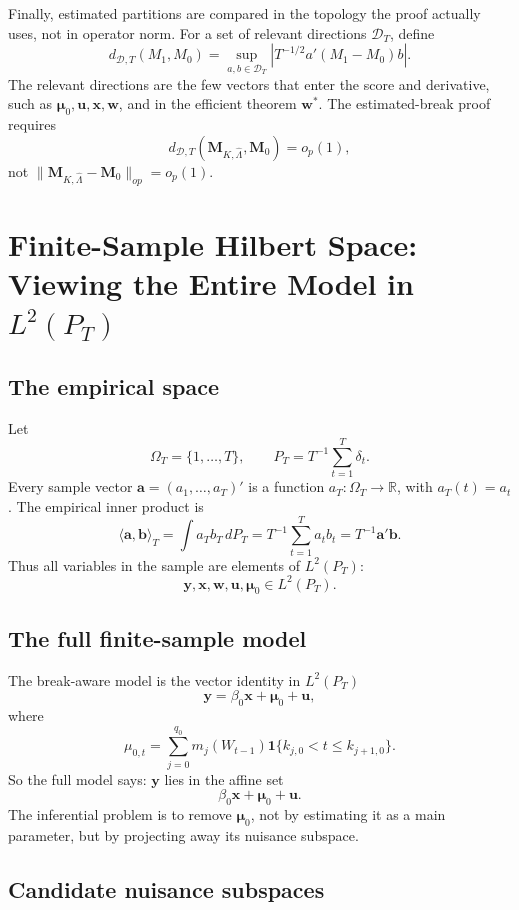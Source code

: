 \documentclass[12pt]{article}
\numberwithin{equation}{section}
\theoremstyle{definition}
\newcommand{\R}{\mathbb R}
\newcommand{\ind}{\mathbf 1}
\newcommand{\LtwoT}{L^2(P_T)}
\newcommand{\innerT}[2]{\langle #1,#2\rangle_T}
\begin{document}
Finally, estimated partitions are compared in the topology the proof actually
uses, not in operator norm. For a set of relevant directions \(\mathcal D_T\),
define
\[
    d_{\mathcal D,T}(M_1,M_0)
    =\sup_{a,b\in\mathcal D_T}
      \left|T^{-1/2}a'(M_1-M_0)b\right|.
\]
The relevant directions are the few vectors that enter the score and derivative,
such as \(\bm\mu_0,\bm u,\bm x,\bm w\), and in the efficient theorem
\(\bm w^*\). The estimated-break proof requires
\[
    d_{\mathcal D,T}(\bm M_{K,\widehat\Lambda},\bm M_0)=o_p(1),
\]
not \(\|\bm M_{K,\widehat\Lambda}-\bm M_0\|_{op}=o_p(1)\).
\section{Finite-Sample Hilbert Space: Viewing the Entire Model in \texorpdfstring{\(L^2(P_T)\)}{L2PT}}

\subsection{The empirical space}

Let
\[
    \Omega_T=\{1,\ldots,T\},
    \qquad
    P_T=T^{-1}\sum_{t=1}^T\delta_t.
\]
Every sample vector \(\bm a=(a_1,\ldots,a_T)'\) is a function
\(a_T:\Omega_T\to\R\), with \(a_T(t)=a_t\). The empirical inner product is
\[
    \innerT{\bm a}{\bm b}
    =\int a_T b_T\,dP_T
    =T^{-1}\sum_{t=1}^Ta_tb_t
    =T^{-1}\bm a'\bm b.
\]
Thus all variables in the sample are elements of \(\LtwoT\):
\[
    \bm y,\bm x,\bm w,\bm u,\bm\mu_0\in\LtwoT.
\]

\subsection{The full finite-sample model}

The break-aware model is the vector identity in \(\LtwoT\)
\begin{equation}
    \bm y=\beta_0\bm x+\bm\mu_0+\bm u,
    \label{eq:l2pt-model}
\end{equation}
where
\[
    \mu_{0,t}=\sum_{j=0}^{q_0}m_j(W_{t-1})\ind\{k_{j,0}<t\le k_{j+1,0}\}.
\]
So the full model says: \(\bm y\) lies in the affine set
\[
    \beta_0\bm x+\bm\mu_0+\bm u.
\]
The inferential problem is to remove \(\bm\mu_0\), not by estimating it as a
main parameter, but by projecting away its nuisance subspace.

\subsection{Candidate nuisance subspaces}
\end{document}
